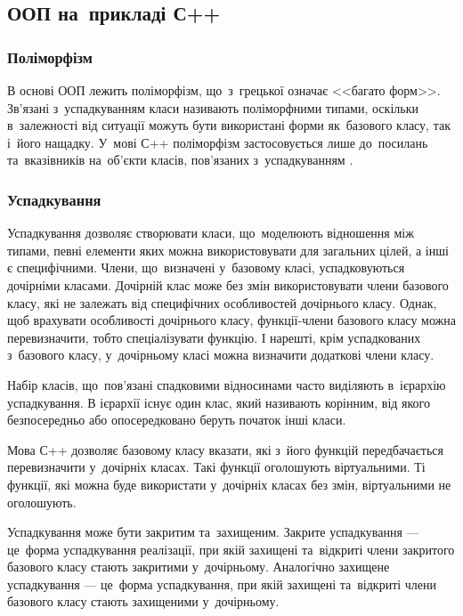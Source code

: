 \documentclass[a4paper,oneside,titlepage,14pt]{extarticle}
\begin{document}
		\subsection{ООП на~прикладі С++}
			\subsubsection{Поліморфізм}
				В основі ООП лежить поліморфізм, що~з~грецької означає <<багато форм>>. Зв'язані з~успадкуванням класи називають поліморфними типами, оскільки в~залежності від ситуації можуть бути використані форми як~базового класу, так і~його нащадку. У~мові С++ поліморфізм застосовується лише до~посилань та~вказівників на~об'єкти класів, пов'язаних з~успадкуванням \cite{lippmancpp}.\par
			\subsubsection{Успадкування}
				Успадкування дозволяє створювати класи, що~моделюють відношення між типами, певні елементи яких можна використовувати для загальних цілей, а інші є специфічними. Члени, що~визначені у~базовому класі, успадковуються дочірніми класами. Дочірній клас може без змін використовувати члени базового класу, які не залежать від специфічних особливостей дочірнього класу. Однак, щоб врахувати особливості дочірнього класу, функції-члени базового класу можна перевизначити, тобто спеціалізувати функцію. І нарешті, крім успадкованих з~базового класу, у~дочірньому класі можна визначити додаткові члени класу.\par
				Набір класів, що~пов'язані спадковими відносинами часто виділяють в~ієрархію успадкування. В ієрархії існує один клас, який називають корінним, від якого безпосередньо або опосередковано беруть початок інші класи.\par
				Мова С++ дозволяє базовому класу вказати, які з~його функцій передбачається перевизначити у~дочірніх класах. Такі функції оголошують віртуальними. Ті функції, які можна буде використати у~дочірніх класах без змін, віртуальними не оголошують.\par
				Успадкування може бути закритим та~захищеним. Закрите успадкування --- це~форма успадкування реалізації, при якій захищені та~відкриті члени закритого базового класу стають закритими у~дочірньому. Аналогічно захищене успадкування --- це~форма успадкування, при якій захищені та~відкриті члени базового класу стають захищеними у~дочірньому.
\end{document}
